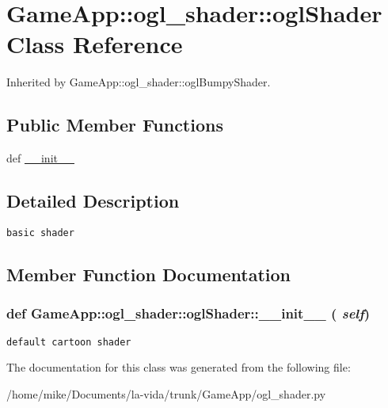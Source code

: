 \hypertarget{classGameApp_1_1ogl__shader_1_1oglShader}{
\section{GameApp::ogl\_\-shader::oglShader Class Reference}
\label{classGameApp_1_1ogl__shader_1_1oglShader}
}
Inherited by GameApp::ogl\_\-shader::oglBumpyShader.

\subsection*{Public Member Functions}
\begin{CompactItemize}
\item 
def \hyperlink{classGameApp_1_1ogl__shader_1_1oglShader_6aa601ff280db2d8d1956df971e0b6fb}{\_\-\_\-init\_\-\_\-}
\end{CompactItemize}


\subsection{Detailed Description}


\footnotesize\begin{verbatim}basic shader\end{verbatim}
\normalsize
 

\subsection{Member Function Documentation}
\hypertarget{classGameApp_1_1ogl__shader_1_1oglShader_6aa601ff280db2d8d1956df971e0b6fb}{
\subsubsection[\_\-\_\-init\_\-\_\-]{\setlength{\rightskip}{0pt plus 5cm}def GameApp::ogl\_\-shader::oglShader::\_\-\_\-init\_\-\_\- ( {\em self})}}
\label{classGameApp_1_1ogl__shader_1_1oglShader_6aa601ff280db2d8d1956df971e0b6fb}




\footnotesize\begin{verbatim}default cartoon shader\end{verbatim}
\normalsize
 

The documentation for this class was generated from the following file:\begin{CompactItemize}
\item 
/home/mike/Documents/la-vida/trunk/GameApp/ogl\_\-shader.py\end{CompactItemize}
